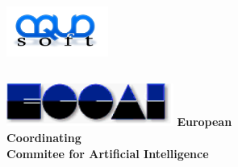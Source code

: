 \documentclass{beamer}
\begin{document}
\begin{frame}[t]
	\begin{center}
		\includegraphics[width=0.25\textwidth]{graphics/intro/aquasoft-logo}%
	\end{center}%
	\pause
	\begin{columns}[h]
			\hfill \includegraphics[width=0.6\textwidth]{graphics/intro/eccai-logo}%
			\small{\textbf{European Coordinating}} \hfill\\%
			\small{\textbf{Commitee for Artificial Intelligence}} \hfill%
	\end{columns}
\end{frame}
\end{document}
